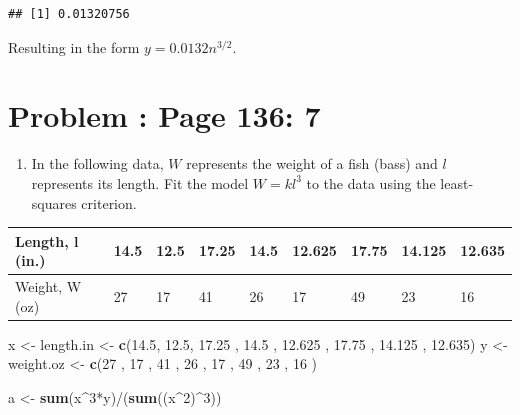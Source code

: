 \documentclass[]{article}
\newenvironment{Shaded}{\begin{snugshade}}{\end{snugshade}}
\newcommand{\KeywordTok}[1]{\textcolor[rgb]{0.13,0.29,0.53}{\textbf{{#1}}}}
\newcommand{\DecValTok}[1]{\textcolor[rgb]{0.00,0.00,0.81}{{#1}}}
\newcommand{\FloatTok}[1]{\textcolor[rgb]{0.00,0.00,0.81}{{#1}}}
\newcommand{\StringTok}[1]{\textcolor[rgb]{0.31,0.60,0.02}{{#1}}}
\newcommand{\NormalTok}[1]{{#1}}
\providecommand{\tightlist}{%
  \setlength{\itemsep}{0pt}\setlength{\parskip}{0pt}}
\begin{document}
\begin{verbatim}
## [1] 0.01320756
\end{verbatim}

Resulting in the form \(y = 0.0132n^{3/2}\).

\section{Problem : Page 136: 7}\label{problem-page-136-7}

\begin{enumerate}
\def\labelenumi{\alph{enumi}.}
\tightlist
\item
  In the following data, \(W\) represents the weight of a fish (bass)
  and \(l\) represents its length. Fit the model \(W = kl^3\) to the
  data using the least-squares criterion.
\end{enumerate}

\begin{table}[!htbp]
\centering
\label{my-label}
\begin{tabular}{l|llllllll}
Length, l (in.) & 14.5 & 12.5 & 17.25 & 14.5 & 12.625 & 17.75 & 14.125 & 12.635 \\ \hline
Weight, W (oz)  & 27   & 17   & 41    & 26   & 17     & 49    & 23     & 16  
\end{tabular}
\end{table}

\begin{Shaded}
\begin{Highlighting}[]
\NormalTok{x <-}\StringTok{ }\NormalTok{length.in <-}\StringTok{ }\KeywordTok{c}\NormalTok{(}\FloatTok{14.5}\NormalTok{, }\FloatTok{12.5}\NormalTok{, }\FloatTok{17.25} \NormalTok{, }\FloatTok{14.5} \NormalTok{, }\FloatTok{12.625} \NormalTok{, }\FloatTok{17.75} \NormalTok{, }\FloatTok{14.125} \NormalTok{, }\FloatTok{12.635}\NormalTok{)}
\NormalTok{y <-}\StringTok{ }\NormalTok{weight.oz <-}\StringTok{ }\KeywordTok{c}\NormalTok{(}\DecValTok{27} \NormalTok{, }\DecValTok{17}   \NormalTok{, }\DecValTok{41}    \NormalTok{, }\DecValTok{26}   \NormalTok{, }\DecValTok{17}     \NormalTok{, }\DecValTok{49}    \NormalTok{, }\DecValTok{23}     \NormalTok{, }\DecValTok{16} \NormalTok{)}

\NormalTok{a <-}\StringTok{ }\KeywordTok{sum}\NormalTok{(x^}\DecValTok{3}\NormalTok{*y)/(}\KeywordTok{sum}\NormalTok{((x^}\DecValTok{2}\NormalTok{)^}\DecValTok{3}\NormalTok{))}
\end{Highlighting}
\end{Shaded}
\end{document}
